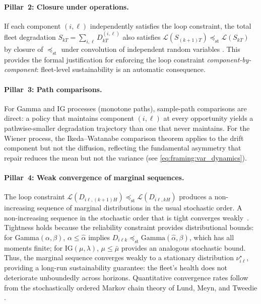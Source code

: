 \documentclass[11pt,a4paper]{article}
\theoremstyle{plain}
\theoremstyle{definition}
\theoremstyle{remark}
\begin{document}
\paragraph{Pillar~2: Closure under operations.}
If each component $(i,\ell)$ independently satisfies the loop constraint, the
total fleet degradation $S_{kT} = \sum_{i,\ell} D_{kT}^{(i,\ell)}$ also satisfies
$\mathcal{L}(S_{(k+1)T}) \preceq_{\mathrm{st}} \mathcal{L}(S_{kT})$ by closure
of $\preceq_{\mathrm{st}}$ under convolution of independent random
variables \cite[Thm.~1.A.3]{shaked2007}. This provides the formal justification
for enforcing the loop constraint \emph{component-by-component}: fleet-level
sustainability is an automatic consequence.

\paragraph{Pillar~3: Path comparisons.}
For Gamma and IG processes (monotone paths), sample-path comparisons are direct:
a policy that maintains component $(i,\ell)$ at every opportunity yields a
pathwise-smaller degradation trajectory than one that never maintains.
For the Wiener process, the Ikeda--Watanabe comparison theorem \cite{ikeda1977}
applies to the drift component but not the diffusion, reflecting the fundamental
asymmetry that repair reduces the mean but not the variance
(see \eqref{eq:framing:var_dynamics}).

\paragraph{Pillar~4: Weak convergence of marginal sequences.}
The loop constraint $\mathcal{L}(D_{i\ell,(k+1)H}) \preceq_{\mathrm{st}}
\mathcal{L}(D_{i\ell,kH})$ produces a non-increasing sequence of marginal distributions
in the usual stochastic order.
A non-increasing sequence in the stochastic order that is tight converges
weakly~\cite[Sec.~1.2]{muller2002}.
Tightness holds because the reliability constraint provides distributional bounds:
for Gamma$(\alpha, \beta)$, $\alpha \le \hat{\alpha}$ implies
$D_{i\ell k} \preceq_{\mathrm{st}} \mathrm{Gamma}(\hat{\alpha}, \beta)$, which
has all moments finite; for IG$(\mu, \lambda)$, $\mu \le \bar{\mu}$ provides
an analogous stochastic bound.
Thus, the marginal sequence converges weakly to a stationary
distribution $\nu_{i\ell}^\star$, providing a long-run sustainability guarantee:
the fleet's health does not deteriorate unboundedly across horizons. Quantitative
convergence rates follow from the stochastically ordered Markov chain theory of
Lund, Meyn, and Tweedie \cite{lund1996}.
\end{document}
